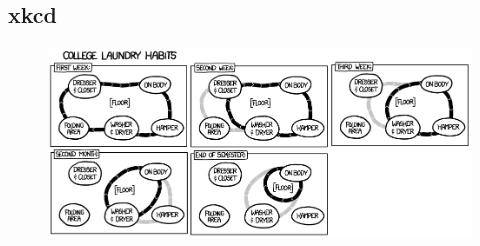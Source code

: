 \documentclass{beamer}
\begin{document}
\subsection{xkcd}
\begin{frame}[plain]
  \begin{figure}
    \begin{center}
      \includegraphics[width=320pt]{laundry}
    \end{center}
  \end{figure}
\end{frame}
\end{document}
